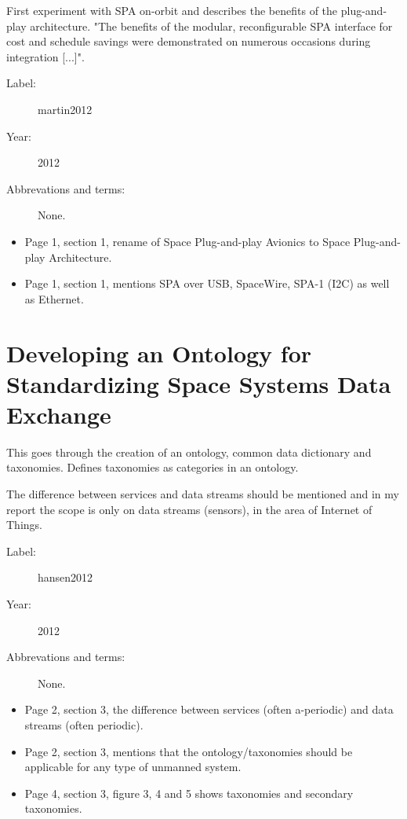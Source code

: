 First experiment with SPA on-orbit and describes the benefits of the
plug-and-play architecture. "The benefits of the modular, reconfigurable SPA
interface for cost and schedule savings were demonstrated on numerous occasions
during integration [...]".

\begin{description}
    \item[Label:] martin2012 \cite{martin2012}
    \item[Year:] 2012
    \item[Abbrevations and terms:] None.
\end{description}

\begin{itemize}
    \item Page 1, section 1, rename of Space Plug-and-play Avionics to Space
        Plug-and-play Architecture.
    \item Page 1, section 1, mentions SPA over USB, SpaceWire, SPA-1 (I2C) as
        well as Ethernet.
\end{itemize}

\section{Developing an Ontology for Standardizing Space Systems Data Exchange}

This goes through the creation of an ontology, common data dictionary and
taxonomies. Defines taxonomies as categories in an ontology.

The difference between services and data streams should be mentioned and in my
report the scope is only on data streams (sensors), in the area of Internet of
Things.

\begin{description}
    \item[Label:] hansen2012 \cite{hansen2012}
    \item[Year:] 2012
    \item[Abbrevations and terms:] None.
\end{description}

\begin{itemize}
    \item Page 2, section 3, the difference between services (often a-periodic)
        and data streams (often periodic).
    \item Page 2, section 3, mentions that the ontology/taxonomies should be
        applicable for any type of unmanned system.
    \item Page 4, section 3, figure 3, 4 and 5 shows taxonomies and secondary
        taxonomies.
\end{itemize}

